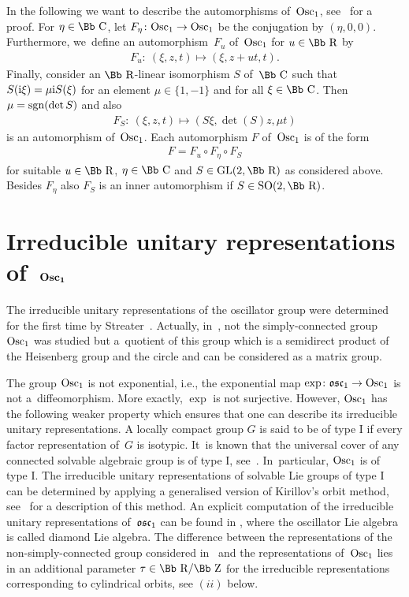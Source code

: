 \documentclass[10pt,a4paper]{amsart}
\newcommand\CC{{\mbox{\Bb C}}}
\newcommand\RR{{\mbox{\Bb R}}}
\newcommand\ZZ{{\mbox{\Bb Z}}}
\newcommand\osc{\frak o \frak s \frak c}
\newcommand{\GL}{\mathop{{\rm GL}}}
\newcommand{\SO}{\mathop{{\rm SO}}}
\newcommand{\Osc}{{\rm Osc}}
\newcommand{\sgn}{\mathop{{\rm sgn}}}
\numberwithin{equation}{section}
\begin{document}
In the following we want to describe the automorphisms of~$\Osc_1$, see~\cite{F} for a proof.
For $\eta\in\CC$, let $F_\eta\colon \Osc_1\rightarrow \Osc_1$ be the conjugation by $(\eta,0,0)$. Furthermore, we~define an automorphism~$F_u$ of~$\Osc_1$ for $u\in\RR$ by
\begin{gather}\label{EFu}
F_u\colon \ (\xi, z, t)\longmapsto (\xi,z+ut,t).
\end{gather}
Finally, consider an $\RR$-linear isomorphism $S$ of~$\CC$ such that $S({\rm i}\xi)=\mu {\rm i}S(\xi)$ for an element $\mu\in\{1,-1\}$ and for all $\xi\in\CC$. Then
$\mu=\sgn(\det S)$ and also
\begin{gather}\label{ES}
F_{S}\colon \ (\xi,z,t)\longmapsto (S\xi,\det(S) z,\mu t)
\end{gather}
is an automorphism of~$\Osc_1$. Each automorphism $F$ of~$\Osc_1$ is of the form
\begin{gather*}
F=F_u\circ F_{\eta}\circ F_{S}
\end{gather*}
for suitable $u\in\RR$, $\eta\in \CC$ and $S\in\GL(2,\RR)$ as considered above. Besides $F_\eta$ also $F_S$ is an inner automorphism if $S\in\SO(2,\RR)$.
%
\section[Irreducible unitary representations of~$\Osc_1$]
{Irreducible unitary representations of~$\boldsymbol{\Osc_1}$} \label{irrrep}

The irreducible unitary representations of the oscillator group were determined for the first time by Streater~\cite{St67}. Actually, in~\cite{St67}, not the simply-connected group $\Osc_1$ was studied but a~quotient of this group which is a semidirect product of the Heisenberg group and the circle and can be considered as a matrix group.

The group $\Osc_1$ is not exponential, i.e., the exponential map $\exp\colon \osc_1\to\Osc_1$ is not a~dif\-feo\-morphism. More exactly, $\exp$ is not surjective. However, $\Osc_1$
has the following weaker property which ensures that one can describe its irreducible unitary representations.
A locally compact group $G$ is said to be of type I if every factor representation of~$G$ is isotypic. It~is known that the universal cover of any connected solvable algebraic group is of type I, see~\cite[p.~440]{Pu69}. In~particular, $\Osc_1$ is of type I. The irreducible unitary representations of solvable Lie groups of type I can be determined by applying a generalised version of Kirillov's orbit method, see~\cite{AK71,Ki99,Ki04} for a description of this method. An explicit computation of the irreducible unitary representations of~$\osc_1$ can be found in \cite[Section~4.3]{Ki04}, where the oscillator Lie algebra is called diamond Lie algebra.
The difference between the representations of the non-simply-connected group considered in~\cite{St67} and the representations of~$\Osc_1$ lies in an additional parameter $\tau\in\RR/\ZZ$ for the irreducible representations corresponding to cylindrical orbits, see $(ii)$ below.
\end{document}

